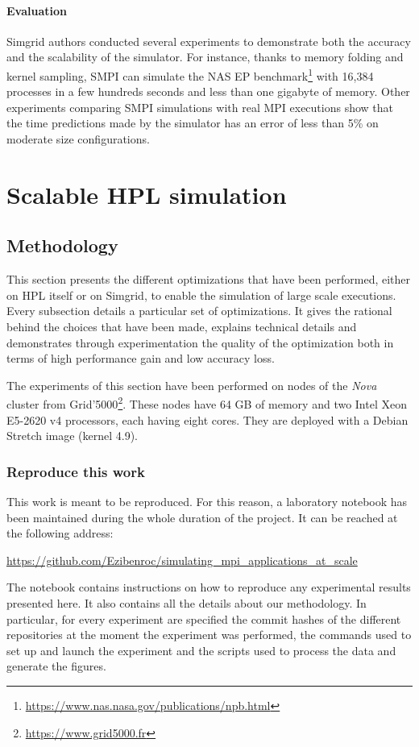 \documentclass[12pt, a4paper]{memoir}
\begin{document}
\subsubsection{Evaluation}
\label{sec:org5db818b}
Simgrid authors conducted several experiments to demonstrate both the accuracy and the scalability of the
simulator. For instance, thanks to memory folding and kernel sampling, SMPI can simulate the NAS EP
benchmark\footnote{\url{https://www.nas.nasa.gov/publications/npb.html}} with 16,384 processes in a few hundreds seconds and less than one gigabyte of
memory\cite{degomme:hal-01415484}. Other experiments comparing SMPI simulations with real MPI executions show that
the time predictions made by the simulator has an error of less than 5\% on moderate size configurations.
\chapter{Scalable HPL simulation}
\label{sec:org5bef26f}
\section{Methodology}
\label{sec:org9d35c80}
This section presents the different optimizations that have been performed, either on HPL itself or on Simgrid, to
enable the simulation of large scale executions. Every subsection details a particular set of optimizations. It gives
the rational behind the choices that have been made, explains technical details and demonstrates through
experimentation the quality of the optimization both in terms of high performance gain and low accuracy loss.

The experiments of this section have been performed on nodes of the \emph{Nova} cluster from Grid'5000\footnote{\url{https://www.grid5000.fr}}. These nodes
have 64 GB of memory and two Intel Xeon E5-2620 v4 processors, each having eight cores. They are deployed with a
Debian Stretch image (kernel 4.9).
\subsection{Reproduce this work}
\label{sec:org2efb0ca}
This work is meant to be reproduced. For this reason, a laboratory notebook has been maintained during the whole
duration of the project. It can be reached at the following address:

\url{https://github.com/Ezibenroc/simulating\_mpi\_applications\_at\_scale}

The notebook contains instructions on how to reproduce any experimental results presented here. It also contains all
the details about our methodology. In particular, for every experiment are specified the commit hashes of the
different repositories at the moment the experiment was performed, the commands used to set up and launch the
experiment and the scripts used to process the data and generate the figures.
\end{document}
